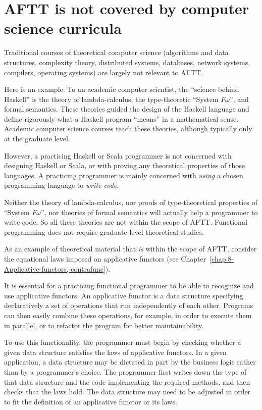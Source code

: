 \section{AFTT is not covered by computer science curricula}

Traditional courses of theoretical computer science (algorithms and
data structures, complexity theory, distributed systems, databases,
network systems, compilers, operating systems) are largely not relevant
to AFTT.

Here is an example: To an academic computer scientist, the ``science
behind Haskell'' is the theory of lambda-calculus, the type-theoretic
``System $F\omega$'', and formal semantics. These theories guided
the design of the Haskell language and define rigorously what a Haskell
program ``means'' in a mathematical sense. Academic computer science
courses teach these theories, although typically only at the graduate
level. 

However, a practicing Haskell or Scala programmer is not concerned
with designing Haskell or Scala, or with proving any theoretical properties
of those languages. A practicing programmer is mainly concerned with
\emph{using} a chosen programming language to \emph{write code}. 

Neither the theory of lambda-calculus, nor proofs of type-theoretical
properties of ``System $F\omega$'', nor theories of formal semantics
will actually help a programmer to write code. So all these theories
are not within the scope of AFTT. Functional programming does not
require graduate-level theoretical studies.

As an example of theoretical material that \emph{is} within the scope
of AFTT, consider the equational laws imposed on applicative functors
(see Chapter~\ref{chap:8-Applicative-functors,-contrafunc}). 

It is essential for a practicing functional programmer to be able
to recognize and use applicative functors. An applicative functor
is a data structure specifying declaratively a set of operations that
run independently of each other. Programs can then easily combine
these operations, for example, in order to execute them in parallel,
or to refactor the program for better maintainability.

To use this functionality, the programmer must begin by checking whether
a given data structure satisfies the laws of applicative functors.
In a given application, a data structure may be dictated in part by
the business logic rather than by a programmer's choice. The programmer
first writes down the type of that data structure and the code implementing
the required methods, and then checks that the laws hold. The data
structure may need to be adjusted in order to fit the definition of
an applicative functor or its laws.

